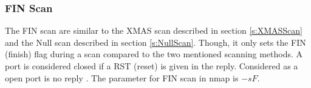 \subsubsection{FIN Scan}
\label{s:FINScan}
The FIN scan are similar to the XMAS scan described in section \ref{s:XMASScan} and the Null scan described in section \ref{s:NullScan}. Though, it only sets the FIN (finish) flag during a scan compared to the two mentioned scanning methods. A port is considered closed if a RST (reset) is given in the reply. Considered as a open port is no reply \autocite{pinkard2008nmap, 10.5555/1538595}.
The parameter for FIN scan in nmap is $-sF$.
